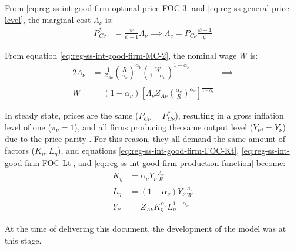 \documentclass[
thesis.tex
]{subfiles}
\begin{document}
From \ref{eq:reg-ss-int-good-firm-optimal-price-FOC-3} and \ref{eq:reg-ss-general-price-level}, the marginal cost $\Lambda_{\nu}$ is:
\begin{align}
	P_{C\nu}^\ast &= \frac{\psi}{\psi-1} \Lambda_{\nu} \implies \Lambda_{\nu} = P_{C\nu} \frac{\psi-1}{\psi} \label{eq:reg-ss-marginal-cost}
\end{align}

From equation \ref{eq:reg-ss-int-good-firm-MC-2}, the nominal wage $W$ is:
\begin{alignat}{2}
	\Lambda_{\nu} &= \frac{1}{Z_{A\nu}} \left( \frac{R}{{\alpha_\nu}} \right)^{{\alpha_\nu}} \left( \frac{W}{1-{\alpha_\nu}} \right)^{1-{\alpha_\nu}} &\implies \nonumber \\ 
	W &= (1-{\alpha_\nu}) \left[ \Lambda_{\nu} Z_{A\nu} \left( \frac{{\alpha_\nu}}{R} \right)^{{\alpha_\nu}} \right]^\frac{1}{1-{\alpha_\nu}} &\, \label{eq:reg-ss-nominal-wage}
\end{alignat}

In steady state, prices are the same ($P_{C\nu} = P_{C\nu}^\ast$), resulting in a gross inflation level of one ($\pi_{\nu} = 1$), and all firms producing the same output level ($Y_{\nu j} = Y_{\nu}$) due to the price parity \cite[Lecture 13, p.12]{solis-garcia_ucb_2022}. For this reason, they all demand the same amount of factors ($K_{\eta}, L_{\eta}$), and equations \ref{eq:reg-ss-int-good-firm-FOC-Kt}, \ref{eq:reg-ss-int-good-firm-FOC-Lt}, and \ref{eq:reg-ss-int-good-firm-production-function} become:
\begin{align}
	K_{\eta} &= {\alpha_\nu} Y_{\nu} \frac{\Lambda_{\nu}}{R} \label{eq:reg-ss-int-good-firm-FOC-Kt-2} \\
	L_{\eta} &= (1-{\alpha_\nu}) Y_{\nu} \frac{\Lambda_{\nu}}{W} \label{eq:reg-ss-int-good-firm-FOC-Lt-2} \\
	Y_{\nu} &= Z_{A\nu} K_{\eta}^{\alpha_\nu} L_{\eta}^{1 -{\alpha_\nu}} \label{eq:reg-ss-int-good-firm-production-function-2}
\end{align}

At the time of delivering this document, the development of the model was at this stage.
\end{document}
